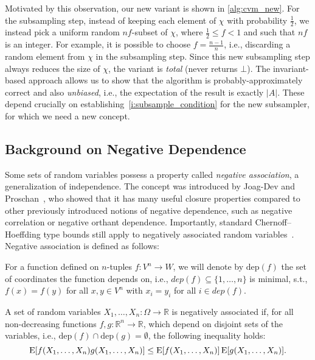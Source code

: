 Motivated by this observation, our new variant is shown in \cref{alg:cvm_new}.
For the subsampling step, instead of keeping each element of $\chi$ with probability $\frac{1}{2}$, we instead pick a uniform random $nf$-subset of $\chi$, where $\frac{1}{2} \leq f < 1$ and such that $nf$ is an integer.
For example, it is possible to choose $f = \frac{n-1}{n}$, i.e., discarding a random element from $\chi$ in the subsampling step.
Since this new subsampling step always reduces the size of $\chi$, the variant is \emph{total} (never returns $\bot$).
The invariant-based approach allows us to show that the algorithm is probably-approximately correct and also \emph{unbiased}, i.e., the expectation of the result is exactly $|A|$.
These depend crucially on establishing~\cref{i:subsample_condition} for the new subsampler, for which we need a new concept.

\subsection{Background on Negative Dependence}
Some sets of random variables possess a property called \emph{negative association}, a generalization of independence.
The concept was introduced by Joag-Dev and Proschan~\cite{joagdev1983}, who showed that it has many useful closure properties compared to other previously introduced notions of negative dependence, such as negative correlation or negative orthant dependence. %
Importantly, standard Chernoff--Hoeffding type bounds still apply to negatively associated random variables~\cite[Prop. 7]{dubhashi1998}.
Negative association is defined as follows:
\begin{definition}
For a function defined on $n$-tuples $f: V^n \rightarrow W$, we will denote by $\mathrm{dep}(f)$ the set of coordinates the function depends on, i.e., $dep(f) \subseteq \{1,\ldots,n\}$ is minimal, s.t., $f(x) = f(y)$ for all $x, y \in V^n$ with $x_i = y_i$ for all $i \in dep(f)$.
\end{definition}

\begin{definition}\label{def:neg_assoc}
A set of random variables $X_1,\dots,X_n: \Omega \rightarrow \mathbb R$ is negatively associated if, for all non-decreasing functions $f,g: \mathbb R^n \rightarrow \mathbb R$, which depend on disjoint sets of the variables, i.e., $\mathrm{dep}(f) \cap \mathrm{dep}(g) = \emptyset$, the following inequality holds:
\[
\operatorname{\mathrm{E}} [f(X_1,\ldots,X_n) g(X_1,\ldots,X_n)] \leq \operatorname{\mathrm{E}} [f(X_1,\ldots,X_n)] \operatorname{\mathrm{E}} [g(X_1,\ldots,X_n)] \textrm{.}
\]
\end{definition}

